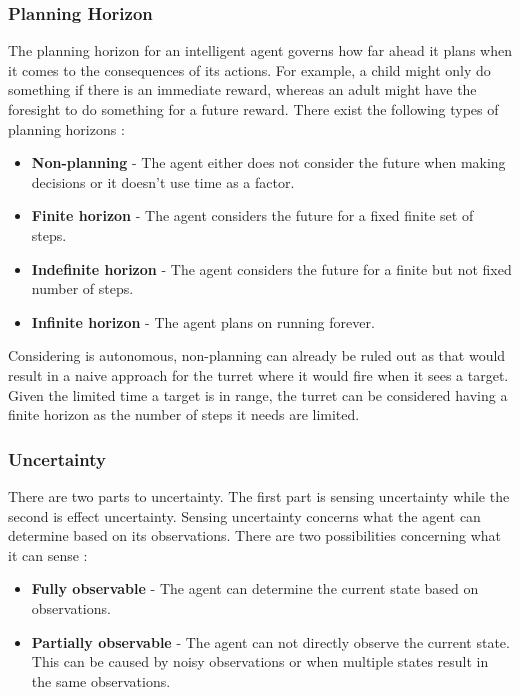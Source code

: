 \subsubsection{Planning Horizon}
The planning horizon for an intelligent agent governs how far ahead it plans
when it comes to the consequences of its actions. For example, a child might
only do something if there is an immediate reward, whereas an adult might have
the foresight to do something for a future reward. There
exist the following types of planning horizons \citep[ch.1.5.3]{MIBook}:
\begin{itemize}
	\item \textbf{Non-planning} - The agent either does not consider the
	future when making decisions or it doesn't use time as a factor.
	\item \textbf{Finite horizon} - The agent considers the future for a fixed
	finite set of steps. 
	\item \textbf{Indefinite horizon} - The agent considers the future for a
	finite but not fixed number of steps.
	\item \textbf{Infinite horizon} - The agent plans on running forever.	
\end{itemize}

Considering \name is autonomous, non-planning can already be ruled
out as that would result in a naive approach for the turret where it
would fire when it sees a target. Given the limited time a target is in range,
the turret can be considered having a finite horizon as the number of steps it
needs are limited.

\subsubsection{Uncertainty}
There are two parts to uncertainty. The first part is sensing uncertainty while
the second is effect uncertainty. Sensing uncertainty concerns what the agent
can determine based on its observations. There are two possibilities concerning
what it can sense \citep[ch.1.5.4]{MIBook}:
\begin{itemize}
  \item \textbf{Fully observable} - The agent can determine the current state
  based on observations.
  \item \textbf{Partially observable} - The agent can not directly observe
  the current state. This can be caused by noisy observations or when multiple
  states result in the same observations.
\end{itemize}

